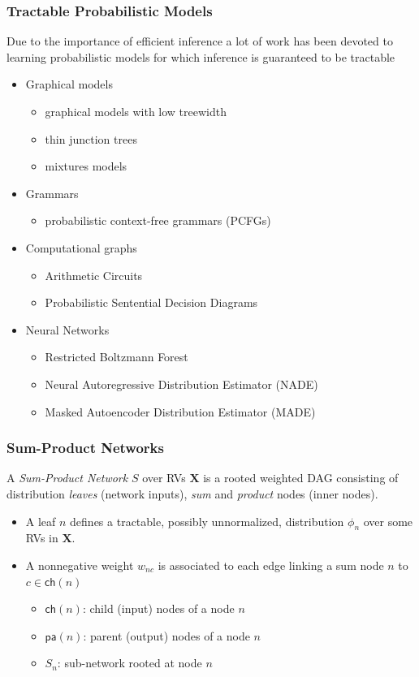 \documentclass[10pt, t, xcolor={usenames,dvipsnames,svgnames}, compress]{beamer}
\begin{document}
\begin{frame}
  \frametitle{Tractable Probabilistic Models}
Due to the importance of efficient inference a lot of work has been devoted to
learning probabilistic models for which inference is guaranteed to be tractable 
\begin{itemize}
\item Graphical models
  \begin{itemize}
  \item  graphical models with low treewidth
  \item thin junction trees
  \item mixtures models
  \end{itemize}
\item Grammars
  \begin{itemize}
  \item probabilistic context-free grammars (PCFGs)
  \end{itemize}
\item Computational graphs
\begin{itemize}
\item Arithmetic Circuits
\item Probabilistic Sentential Decision Diagrams
\end{itemize}
\item Neural Networks
\begin{itemize}
\item Restricted Boltzmann Forest 
\item Neural Autoregressive Distribution Estimator (NADE)
\item Masked Autoencoder Distribution Estimator (MADE)
\end{itemize}
\end{itemize}
\end{frame}

\begin{frame}
  \frametitle{Sum-Product Networks}
  A \emph{Sum-Product Network} $S$ over RVs $\mathbf X$ is a
  rooted weighted DAG consisting of
  distribution \emph{leaves} (network inputs),  \emph{sum} and \emph{product}
  nodes (inner nodes).

\vspace{0.5 cm}
\begin{minipage}{0.65\textwidth}
\begin{itemize}
\item  A leaf $n$ defines a tractable, possibly unnormalized, distribution
  $\phi_{n}$ over some RVs in $\mathbf X$.
\item  A nonnegative weight $w_{nc}$ is associated to each edge linking a sum node
  $n$ to $c\in\mathsf{ch}(n)$
\begin{itemize}
\item $\mathsf{ch}(n)$:  child (input) nodes of   a node $n$ 
\item $\mathsf{pa}(n)$:  parent (output) nodes of a node $n$
\item $S_{n}$: sub-network rooted at node $n$ 
\end{itemize}
\end{itemize}
\end{minipage}
\end{frame}
\end{document}
